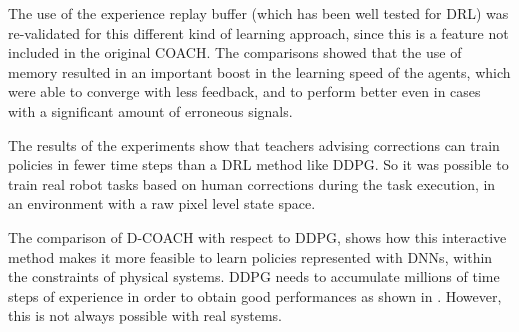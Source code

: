 The use of the experience replay buffer (which has been well tested for DRL) was re-validated for this different kind of learning approach, since this is a feature not included in the original COACH. The comparisons showed that the use of memory resulted in an important boost in the learning speed of the agents, which were able to converge with less feedback, and to perform better even in cases with a significant amount of erroneous signals.  

The results of the experiments show that teachers advising corrections can train policies in fewer time steps than a DRL method like DDPG. So it was possible to train real robot tasks based on human corrections during the task execution, in an environment with a raw pixel level state space. 

The comparison of D-COACH with respect to DDPG, shows how this interactive method makes it more feasible to learn policies represented with DNNs, within the constraints of physical systems. DDPG needs to accumulate millions of time steps of experience in order to obtain good performances as shown in \cite{Lillicrap2015}. However, this is not always possible with real systems.